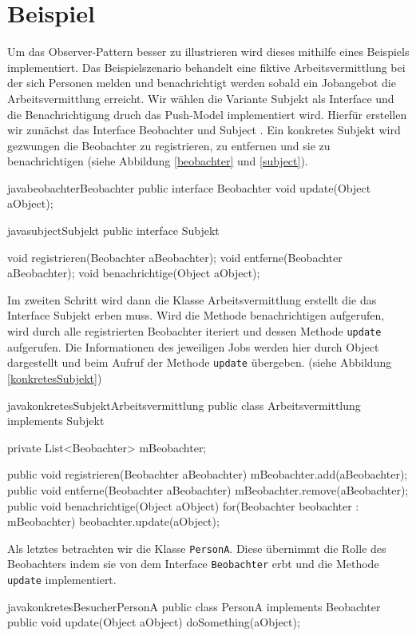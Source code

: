 \section{Beispiel}
Um das Observer-Pattern besser zu illustrieren wird dieses mithilfe eines Beispiels implementiert. Das Beispielszenario behandelt eine fiktive Arbeitsvermittlung bei der sich Personen melden und benachrichtigt werden sobald ein Jobangebot die Arbeitsvermittlung erreicht. Wir wählen die Variante  Subjekt als Interface  und die Benachrichtigung druch das Push-Model implementiert wird. Hierfür erstellen wir zunächst das Interface Beobachter und Subject . Ein konkretes Subjekt wird gezwungen die Beobachter zu registrieren, zu entfernen und sie zu benachrichtigen (siehe Abbildung \ref{beobachter} und \ref{subject}). 

\begin{beispiel}{java}{beobachter}{Beobachter}
public interface Beobachter {
    void update(Object aObject);
}
\end{beispiel}

\begin{beispiel}{java}{subject}{Subjekt}
public interface Subjekt {

    void registrieren(Beobachter aBeobachter);
    void entferne(Beobachter aBeobachter);
    void benachrichtige(Object aObject);

}
\end{beispiel}

Im zweiten Schritt wird dann die Klasse Arbeitsvermittlung erstellt die das Interface Subjekt erben muss. Wird die Methode benachrichtigen aufgerufen, wird durch alle registrierten Beobachter iteriert und dessen Methode \texttt{update} aufgerufen. Die Informationen des jeweiligen Jobs werden hier durch Object dargestellt und beim Aufruf der Methode \texttt{update} übergeben. (siehe Abbildung \ref{konkretesSubjekt})

\begin{beispiel}{java}{konkretesSubjekt}{Arbeitsvermittlung}
public class Arbeitsvermittlung implements Subjekt {
    private List<Beobachter> mBeobachter;
    
    public void registrieren(Beobachter aBeobachter) {
        mBeobachter.add(aBeobachter);
    }
    public void entferne(Beobachter aBeobachter) {
        mBeobachter.remove(aBeobachter);
    }
    public void benachrichtige(Object aObject) {
        for(Beobachter beobachter : mBeobachter){
            beobachter.update(aObject);
        }
    }
}
\end{beispiel}

Als letztes betrachten wir die Klasse \texttt{PersonA}. Diese übernimmt die Rolle des Beobachters indem sie von dem Interface \texttt{Beobachter} erbt und die Methode \texttt{update} implementiert.

\begin{beispiel}{java}{konkretesBesucher}{PersonA}
public class PersonA implements Beobachter{
    public void update(Object aObject) {
        doSomething(aObject);
    }
}
\end{beispiel}